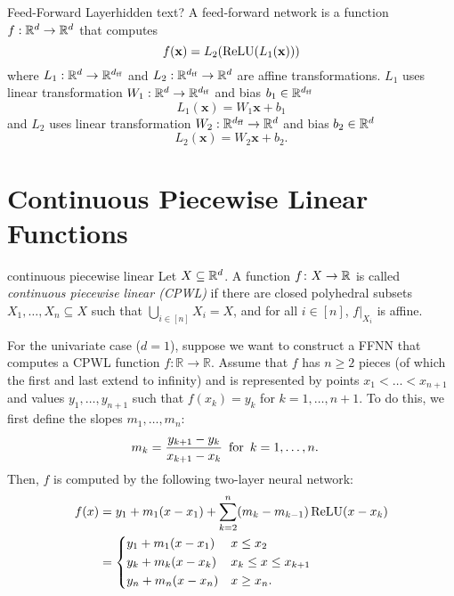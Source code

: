 \begin{definition}{Feed-Forward Layer}{hidden text?}
    A feed-forward network is a function $f:\mathbb{R}^d\to \mathbb{R}^d$ that computes
    \[f(\mathbf{x}) = L_2(\text{ReLU}(L_1(\mathbf{x})))\]
    where $L_1: \mathbb{R}^d \to \mathbb{R}^{d_{\text{ff}}}$ and $L_2: \mathbb{R}^{d_{\text{ff}}} \to \mathbb{R}^{d}$ are affine transformations. $L_1$ uses linear transformation $W_1:\mathbb{R}^d\to \mathbb{R}^{d_{\text{ff}}}$ and bias $b_1\in\mathbb{R}^{d_{\text{ff}}}$
    \[L_1(\mathbf{x}) = W_1 \mathbf{x} + b_1\]
    and $L_2$ uses linear transformation $W_2:\mathbb{R}^{d_{\text{ff}}}\to \mathbb{R}^d$ and bias $b_2\in\mathbb{R}^{d}$
    \[L_2(\mathbf{x}) = W_2 \mathbf{x} + b_2.\]
\end{definition}

\section{Continuous Piecewise Linear Functions}

\begin{definition}{continuous piecewise linear}{}
  Let $X \subseteq \mathbb{R}^d$. A function $f \colon X \to \mathbb{R}$ is called \emph{continuous piecewise linear (CPWL)} if there are closed polyhedral subsets $X_1, \ldots, X_n \subseteq X$ such that $\bigcup_{i\in [n]}  X_i = X$, and for all $i \in [n]$, $\left.f\right|_{X_i}$ is affine.
\end{definition}

For the univariate case ($d=1$), suppose we want to construct a FFNN that computes a CPWL function \(f \colon \mathbb{R} \to \mathbb{R}\). Assume that $f$ has $n \ge 2$ pieces (of which the first and last extend to infinity) and is represented by points \(x_1 < \ldots < x_{n+1}\) and values \(y_1, \ldots, y_{n+1}\) such that \(f(x_k) = y_k\) for \(k = 1, \ldots, n+1\).
To do this, we first define the slopes \(m_1, \ldots, m_n\):
\begin{align*}
  m_k &= \frac{y_{k+1} - y_{k}}{x_{k+1} - x_{k}} \enskip \text{for} \enskip k = 1, \ldots, n.
\end{align*}
Then, \(f\) is computed by the following two-layer neural network:
\begin{align*}
    f(x) &= y_1 + m_1 (x-x_1) + \sum_{k=2}^{n} (m_k - m_{k-1}) \, \text{ReLU}(x - x_k) \\
    &= \begin{dcases}
        y_1 + m_1 (x - x_1) &x \leq x_2 \\
        y_k + m_{k} (x - x_k) & x_k \leq x \leq x_{k+1} \\
        y_n + m_n (x - x_n) & x \geq x_n.
    \end{dcases}
\end{align*}

